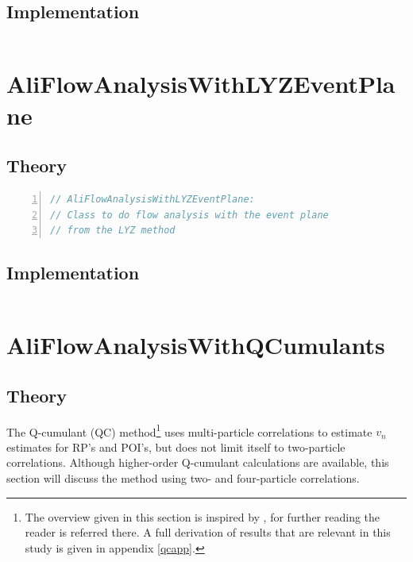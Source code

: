 \documentclass[a4paper]{book}
\numberwithin{equation}{subsection}
\begin{document}
\subsection{Implementation}
\begin{lstlisting}[language=C, numbers=left]

\end{lstlisting}


\section{AliFlowAnalysisWithLYZEventPlane}
\subsection{Theory}
\begin{lstlisting}[language=C, numbers=left]
// AliFlowAnalysisWithLYZEventPlane:
// Class to do flow analysis with the event plane
// from the LYZ method
\end{lstlisting}
\subsection{Implementation}
\begin{lstlisting}[language=C, numbers=left]

\end{lstlisting}


\section{AliFlowAnalysisWithQCumulants}

	\label{qvc}
	\subsection{Theory}
	The Q-cumulant (QC) method\footnote{The overview given in this section is inspired by \cite{bilandzic-2011-83}, for further reading the reader is referred there. A full derivation of results that are relevant in this study is given in appendix \ref{qcapp}.} uses multi-particle correlations to estimate $v_n$ estimates for RP's and POI's, but does not limit itself to two-particle correlations. Although higher-order Q-cumulant calculations are available, this section will discuss the method using two- and four-particle correlations. 
		
\end{document}
